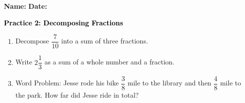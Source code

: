 \documentclass[12pt, letterpaper, fleqn]{article}
\begin{document}
\textbf{Name:} \underline{\hspace{5cm}}
\hfill
\textbf{Date:} \underline{\hspace{3cm}}\\

\begin{tcolorbox}[colback=customteal!20]
    \large\textcolor{black}{\textbf{Practice 2: Decomposing Fractions}}
\end{tcolorbox}
\begin{enumerate}[itemsep=3.5cm, leftmargin=0.6cm]
\item Decompose $\dfrac{7}{10}$ into a sum of three fractions.
\vspace{3.5cm}
\item Write $2\dfrac{1}{3}$ as a sum of a whole number and a fraction.
\vspace{3.5cm}
\item Word Problem: Jesse rode his bike $\dfrac{3}{8}$ mile to the library and then $\dfrac{4}{8}$ mile to the park. How far did Jesse ride in total?
\end{enumerate}
\end{document}
